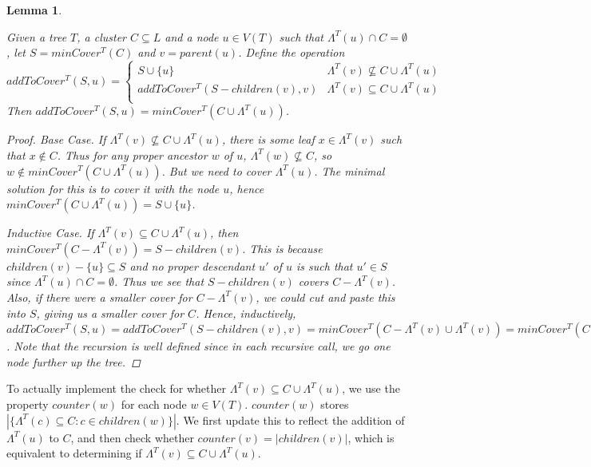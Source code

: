 \documentclass{article}
\newcommand{\leafset}{\Lambda}
\newtheorem{mincoverrecursive}[incompatibility]{Lemma}
\begin{document}
    \begin{mincoverrecursive}
        \label{lem:mincoverrecursive}

        Given a tree $T$, a cluster $C \subseteq L$ and a node $u \in V(T)$ such that $\leafset^{T}(u) \cap C = \emptyset$, let $S = minCover^{T}(C)$ and $v = parent(u)$. Define the operation \[addToCover^{T}(S, u) =
        \begin{cases}
            S \cup \{u\} & \leafset^{T}(v) \not\subseteq C \cup \leafset^{T}(u)\\
            addToCover^{T}(S - children(v), v) & \leafset^{T}(v) \subseteq C \cup \leafset^{T}(u)\\
        \end{cases}\]
        Then $addToCover^{T}(S, u) = minCover^{T}(C \cup \leafset^{T}(u))$.

        \begin{proof}
            \textit{Base Case.} If $\leafset^{T}(v) \not\subseteq C \cup \leafset^{T}(u)$, there is some leaf $x \in \leafset^{T}(v)$ such that $x \not\in C$. Thus for any proper ancestor $w$ of $u$, $\leafset^{T}(w) \not\subseteq C$, so $w \not\in minCover^{T}(C \cup \leafset^{T}(u))$. But we need to cover $\leafset^{T}(u)$. The minimal solution for this is to cover it with the node $u$, hence $minCover^{T}(C \cup \leafset^{T}(u)) = S \cup \{u\}$.

            \textit{Inductive Case.} If $\leafset^{T}(v) \subseteq C \cup \leafset^{T}(u)$, then $minCover^{T}(C - \leafset^{T}(v)) = S - children(v)$. This is because $children(v) - \{u\} \subseteq S$ and no proper descendant $u'$ of $u$ is such that $u' \in S$ since $\leafset^{T}(u) \cap C = \emptyset$. Thus we see that $S - children(v)$ covers $C - \leafset^{T}(v)$. Also, if there were a smaller cover for $C - \leafset^{T}(v)$, we could cut and paste this into $S$, giving us a smaller cover for $C$. Hence, inductively, $addToCover^{T}(S, u) = addToCover^{T}(S - children(v), v) = minCover^{T}(C - \leafset^{T}(v) \cup \leafset^{T}(v)) = minCover^{T}(C \cup \leafset^{T}(u))$. Note that the recursion is well defined since in each recursive call, we go one node further up the tree.
        \end{proof}
    \end{mincoverrecursive}

    To actually implement the check for whether $\leafset^{T}(v) \subseteq C \cup \leafset^{T}(u)$, we use the property $counter(w)$ for each node $w \in V(T)$. $counter(w)$ stores $|\{\leafset^{T}(c) \subseteq C : c \in children(w)\}|$. We first update this to reflect the addition of $\leafset^{T}(u)$ to $C$, and then check whether $counter(v) = |children(v)|$, which is equivalent to determining if $\leafset^{T}(v) \subseteq C \cup \leafset^{T}(u)$.
\end{document}
